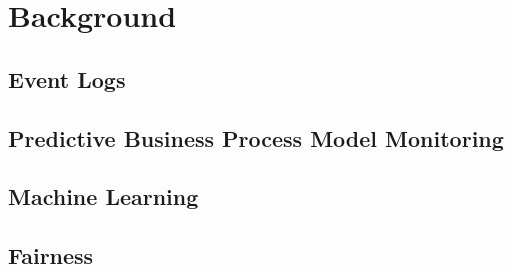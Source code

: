 \chapter{Background}

\section{Event Logs}

\section{Predictive Business Process Model Monitoring}

\section{Machine Learning}


\section{Fairness}